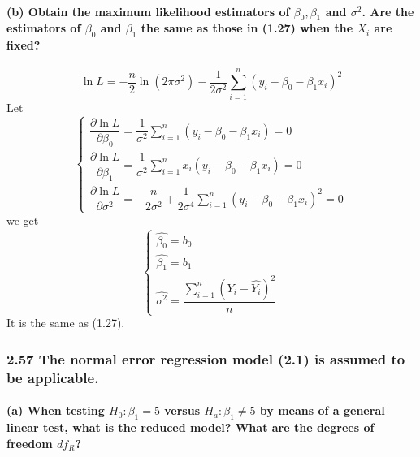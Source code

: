 \documentclass[]{article}
\let\oldparagraph\paragraph
\renewcommand{\paragraph}[1]{\oldparagraph{#1}\mbox{}}
\begin{document}
\paragraph{\texorpdfstring{(b) Obtain the maximum likelihood estimators
of \(\beta_0,\beta_1\) and \(\sigma^2\). Are the estimators of
\(\beta_0\) and \(\beta_1\) the same as those in (1.27) when the \(X_i\)
are
fixed?}{(b) Obtain the maximum likelihood estimators of \textbackslash{}beta\_0,\textbackslash{}beta\_1 and \textbackslash{}sigma\^{}2. Are the estimators of \textbackslash{}beta\_0 and \textbackslash{}beta\_1 the same as those in (1.27) when the X\_i are fixed?}}\label{b-obtain-the-maximum-likelihood-estimators-of-beta_0beta_1-and-sigma2.-are-the-estimators-of-beta_0-and-beta_1-the-same-as-those-in-1.27-when-the-x_i-are-fixed}

\[\ln L=-\frac{n}{2}\ln(2\pi\sigma^2)-\frac{1}{2\sigma^2}\sum\limits_{i=1}^n(y_i-\beta_0-\beta_1x_i)^2\]
Let \[\begin{cases}
\dfrac{\partial \ln L}{\partial \beta_0}=\dfrac{1}{\sigma^2}\sum\limits_{i=1}^n(y_i-\beta_0-\beta_1x_i)=0       \\
\dfrac{\partial \ln L}{\partial \beta_1}= \dfrac{1}{\sigma^2}\sum\limits_{i=1}^nx_i(y_i-\beta_0-\beta_1x_i)=0      \\
\dfrac{\partial \ln L}{\partial \sigma^2}=-\dfrac{n}{2\sigma^2}+\dfrac{1}{2\sigma^4}\sum\limits_{i=1}^n(y_i-\beta_0-\beta_1x_i)^2=0
\end{cases}\] we get \[\begin{cases}
\hat{\beta_0}=b_0    \\
\hat{\beta_1}=b_1      \\
\hat{\sigma^2}=\dfrac{\sum\limits_{i=1}^n(Y_i-\hat{Y_i})^2}{n}
\end{cases}\] It is the same as (1.27).

\subsubsection{2.57 The normal error regression model (2.1) is assumed
to be
applicable.}\label{the-normal-error-regression-model-2.1-is-assumed-to-be-applicable.}

\paragraph{\texorpdfstring{(a) When testing \(H_0: \beta_1= 5\) versus
\(H_a:\beta_1\neq 5\) by means of a general linear test, what is the
reduced model? What are the degrees of freedom
\(df_R\)?}{(a) When testing H\_0: \textbackslash{}beta\_1= 5 versus H\_a:\textbackslash{}beta\_1\textbackslash{}neq 5 by means of a general linear test, what is the reduced model? What are the degrees of freedom df\_R?}}\label{a-when-testing-h_0-beta_1-5-versus-h_abeta_1neq-5-by-means-of-a-general-linear-test-what-is-the-reduced-model-what-are-the-degrees-of-freedom-df_r}
\end{document}
